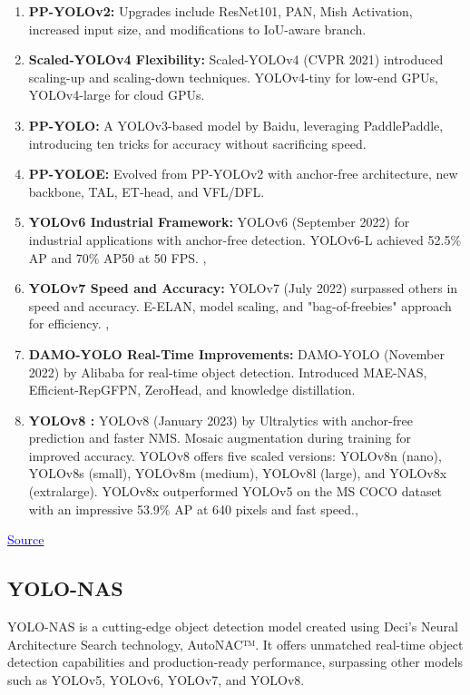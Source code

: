 \begin{enumerate}
    \item \textbf{PP-YOLOv2: }  Upgrades include ResNet101, PAN, Mish Activation, increased input size, and modifications to IoU-aware branch. \cite{huang2021pp}\\
    \item \textbf{Scaled-YOLOv4 Flexibility: } Scaled-YOLOv4 (CVPR 2021) introduced scaling-up and scaling-down techniques. YOLOv4-tiny for low-end GPUs, YOLOv4-large for cloud GPUs. \cite{wang2021scaled}\\ 
    \item \textbf{PP-YOLO: } A YOLOv3-based model by Baidu, leveraging PaddlePaddle, introducing ten tricks for accuracy without sacrificing speed.\cite{long2020pp}\\
    \item \textbf{PP-YOLOE: } Evolved from PP-YOLOv2 with anchor-free architecture, new backbone, TAL, ET-head, and VFL/DFL. \cite{xu2022pp}\\
    \item \textbf{YOLOv6 Industrial Framework: } 
    YOLOv6 (September 2022) for industrial applications with anchor-free detection.
    YOLOv6-L achieved 52.5\% AP and 70\% AP50 at 50 FPS. \cite{li2022yolov6}, \cite{terven2023comprehensive}
    \item \textbf{YOLOv7 Speed and Accuracy: } YOLOv7 (July 2022) surpassed others in speed and accuracy.
    E-ELAN, model scaling, and "bag-of-freebies" approach for efficiency. \cite{wang2023yolov7}, \cite{terven2023comprehensive}\\
    \item \textbf{DAMO-YOLO Real-Time Improvements: } DAMO-YOLO (November 2022) by Alibaba for real-time object detection. 
    Introduced MAE-NAS, Efficient-RepGFPN, ZeroHead, and knowledge distillation. \cite{xu2022damo}\\
    \item \textbf{YOLOv8 :}
    YOLOv8 (January 2023) by Ultralytics with anchor-free prediction and faster NMS. Mosaic augmentation during training for improved accuracy.
    YOLOv8 offers five scaled versions: YOLOv8n (nano), YOLOv8s (small), YOLOv8m (medium), YOLOv8l (large), and YOLOv8x (extra\-large). YOLOv8x outperformed YOLOv5 on the MS COCO dataset with an impressive 53.9\% AP at 640 pixels and fast speed.\cite{yolov8}, \cite{terven2023comprehensive}
\end{enumerate}
\href{https://www.mdpi.com/2504-4990/5/4/83}{\textcolor{blue}{Source}}
\subsection{YOLO-NAS}
YOLO-NAS is a cutting-edge object detection model created using Deci's Neural Architecture Search technology, AutoNAC™. It offers unmatched real-time object detection capabilities and production-ready performance, surpassing other models such as YOLOv5, YOLOv6, YOLOv7, and YOLOv8.

